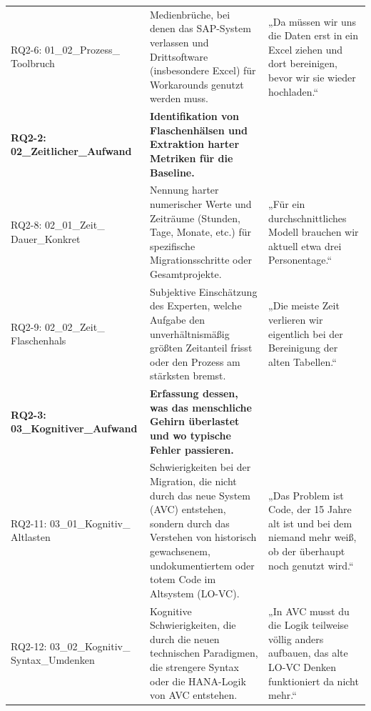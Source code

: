 \documentclass[12pt, a4paper, oneside]{book}
\begin{document}
\begin{xltabular}{\textwidth}{@{} 
    >{\raggedright\arraybackslash}p{4.8cm} 
    >{\raggedright\arraybackslash}p{4.2cm} 
    >{\raggedright\arraybackslash}X @{}}
    RQ2-6: 01\_02\_Prozess\_ \newline Toolbruch & 
    Medienbrüche, bei denen das SAP-System verlassen und Drittsoftware (insbesondere Excel) für Workarounds genutzt werden muss. & 
    „Da müssen wir uns die Daten erst in ein Excel ziehen und dort bereinigen, bevor wir sie wieder hochladen.“ \\
    \addlinespace
    
    \textbf{RQ2-2: 02\_Zeitlicher\_Aufwand} & 
    \textbf{Identifikation von Flaschenhälsen und Extraktion harter Metriken für die Baseline.} & 
    \\
    
    RQ2-8: 02\_01\_Zeit\_ \newline Dauer\_Konkret & 
    Nennung harter numerischer Werte und Zeiträume (Stunden, Tage, Monate, etc.) für spezifische Migrationsschritte oder Gesamtprojekte. & 
    „Für ein durchschnittliches Modell brauchen wir aktuell etwa drei Personentage.“ \\
    
    RQ2-9: 02\_02\_Zeit\_ \newline Flaschenhals & 
    Subjektive Einschätzung des Experten, welche Aufgabe den unverhältnismäßig größten Zeitanteil frisst oder den Prozess am stärksten bremst. & 
    „Die meiste Zeit verlieren wir eigentlich bei der Bereinigung der alten Tabellen.“ \\
    \addlinespace
    
    \textbf{RQ2-3: 03\_Kognitiver\_Aufwand} & 
    \textbf{Erfassung dessen, was das menschliche Gehirn überlastet und wo typische Fehler passieren.} & 
    \\
    
    RQ2-11: 03\_01\_Kognitiv\_ \newline Altlasten & 
    Schwierigkeiten bei der Migration, die nicht durch das neue System (AVC) entstehen, sondern durch das Verstehen von historisch gewachsenem, undokumentiertem oder totem Code im Altsystem (LO-VC). & 
    „Das Problem ist Code, der 15 Jahre alt ist und bei dem niemand mehr weiß, ob der überhaupt noch genutzt wird.“ \\
    
    RQ2-12: 03\_02\_Kognitiv\_ \newline Syntax\_Umdenken & 
    Kognitive Schwierigkeiten, die durch die neuen technischen Paradigmen, die strengere Syntax oder die HANA-Logik von AVC entstehen. & 
    „In AVC musst du die Logik teilweise völlig anders aufbauen, das alte LO-VC Denken funktioniert da nicht mehr.“ \\
    

\end{xltabular}
\end{document}
